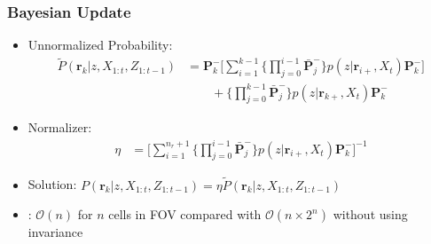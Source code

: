 \documentclass[11pt,professionalfonts,hyperref={pdftex,pdfpagemode=none,pdfstartview=FitH}]{beamer}
\renewcommand{\emph}[1]{\textit{\textbf{\color{blue}{#1}}}}
\begin{document}
\begin{frame}
\frametitle{Bayesian Update}

\begin{itemize}
	\item Unnormalized Probability:
	\begin{align*}
\tilde P(\mathbf{r}_{k}|z,X_{1:t},Z_{1:t-1})
&=\mathbf{P}_k^-
\bigg[\sum_{i=1}^{k-1}\bigg\{\prod_{j=0}^{i-1}\bar{\mathbf{P}}_j^-\bigg\}p(z|\mathbf{r}_{i+},X_t)\mathbf{P}_k^-\bigg]\nonumber\\
&\qquad + \bigg\{\prod_{j=0}^{k-1}\bar{\mathbf{P}}_j^-\bigg\}p(z|\mathbf{r}_{k+},X_t)\mathbf{P}_k^-
\end{align*}
	\item Normalizer:
	\begin{align*}
\label{eqn:allEta}
\eta
&=
\bigg[\sum_{i=1}^{n_{r}+1}\bigg\{\prod_{j=0}^{i-1}\bar{\mathbf{P}}_j^-\bigg\} p(z|\mathbf{r}_{i+},X_t)\mathbf{P}_k^-\bigg]^{-1}
\end{align*}
	\item Solution: $P(\mathbf{r}_{k}|z,X_{1:t},Z_{1:t-1})=\eta\tilde P(\mathbf{r}_{k}|z,X_{1:t},Z_{1:t-1})$
	\item \emph{Linear Complexity}: $\mathcal{O}(n)$ for \emph{all} $n$ cells in FOV compared with $\mathcal O(n\times2^n)$ without using invariance
\end{itemize}
\end{frame}

\end{document}
